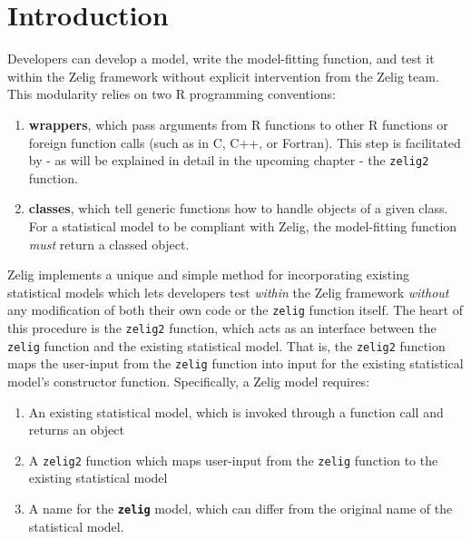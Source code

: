 \section{Introduction}
Developers can develop a model, write the model-fitting function, and test it
within the Zelig framework without explicit intervention from the Zelig team. 
This modularity relies on two R programming conventions:


\begin{enumerate}

	\item {\bf wrappers}, which pass arguments from R functions to other R functions
		or foreign function calls (such as in C, C++, or Fortran).  This step is
		facilitated by - as will be explained in detail in the upcoming chapter -
		the {\tt zelig2} function.
		
	\item {\bf classes}, which tell generic functions how to handle objects of a given
		class.  For a statistical model to be compliant with Zelig, the model-fitting
		function \emph{must} return a classed object.
		
\end{enumerate}

Zelig implements a unique and simple method for incorporating existing statistical
models which lets developers test \emph{within} the Zelig framework \emph{without} any
modification of both their own code or the {\tt zelig} function itself.  The heart of
this procedure is the {\tt zelig2} function, which acts as an interface between the
{\tt zelig} function and the existing statistical model.  That is, the {\tt zelig2}
function maps the user-input from the {\tt zelig} function into input for the existing
statistical model's constructor function.  Specifically, a Zelig model requires:

%
\begin{enumerate}

	\item An existing statistical model, which is invoked through a function call and
		returns an object

	\item A {\tt zelig2} function which maps user-input from the {\tt zelig} function to
		the existing statistical model
		
	\item A name for the {\tt \bf zelig} model, which can differ from the original name of
		the statistical model.
		
\end{enumerate}


